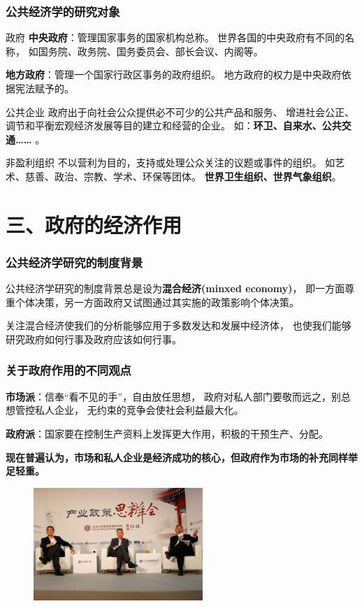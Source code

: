 \documentclass[aspectratio=169, 12pt]{beamer}
\begin{document}
\begin{frame}[plain]
    \frametitle{公共经济学的研究对象}
    \begin{block}{政府}
        \textbf{中央政府}：管理国家事务的国家机构总称。
        世界各国的中央政府有不同的名称，
        如国务院、政务院、国务委员会、部长会议、内阁等。
        \par
        \textbf{地方政府}：管理一个国家行政区事务的政府组织。
        地方政府的权力是中央政府依据宪法赋予的。
    \end{block}
    \begin{block}{公共企业}
        政府出于向社会公众提供必不可少的公共产品和服务、
        增进社会公正、调节和平衡宏观经济发展等目的建立和经营的企业。
        如：\textbf{环卫、自来水、公共交通…… }。
    \end{block}
    \begin{block}{非盈利组织}
        不以营利为目的，支持或处理公众关注的议题或事件的组织。
        如艺术、慈善、政治、宗教、学术、环保等团体。
        \textbf{世界卫生组织、世界气象组织}。
    \end{block}
\end{frame}

\section{三、政府的经济作用}

\begin{frame}[plain]
    \frametitle{公共经济学研究的制度背景}
    公共经济学研究的制度背景总是设为\textbf{混合经济(minxed economy)}，
    即一方面尊重个体决策，另一方面政府又试图通过其实施的政策影响个体决策。
    \par
    关注混合经济使我们的分析能够应用于多数发达和发展中经济体，
    也使我们能够研究政府如何行事及政府应该如何行事。
\end{frame}

\begin{frame}[plain]
    \frametitle{关于政府作用的不同观点}
    \textbf{市场派}：信奉“看不见的手”，自由放任思想，
    政府对私人部门要敬而远之，别总想管控私人企业，
    无约束的竞争会使社会利益最大化。
    \par
    \textbf{政府派}：国家要在控制生产资料上发挥更大作用，积极的干预生产、分配。
    \par
    \textbf{现在普遍认为，市场和私人企业是经济成功的核心，但政府作为市场的补充同样举足轻重。}
    \begin{figure}[htbp]
        \centering
        \includegraphics[width=0.57\textwidth]{./resources/figure/bate.jpg}
    \end{figure}
\end{frame}
\end{document}
